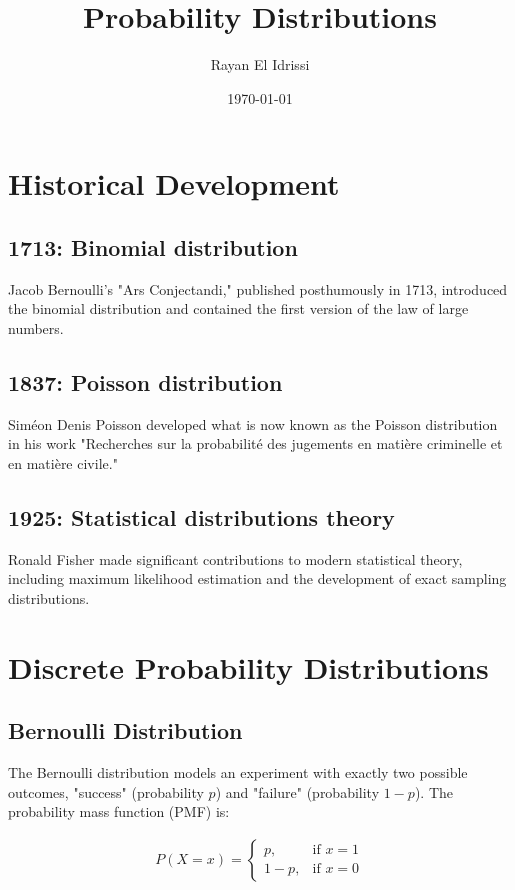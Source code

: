 \documentclass[12pt,a4paper]{article}
\title{Probability Distributions}
\author{Rayan El Idrissi}
\date{\today}
\begin{document}
\maketitle
\tableofcontents
\newpage

\section{Historical Development}
\subsection{1713: Binomial distribution}
Jacob Bernoulli's "Ars Conjectandi," published posthumously in 1713, introduced the binomial distribution and contained the first version of the law of large numbers.

\subsection{1837: Poisson distribution}
Siméon Denis Poisson developed what is now known as the Poisson distribution in his work "Recherches sur la probabilité des jugements en matière criminelle et en matière civile."

\subsection{1925: Statistical distributions theory}
Ronald Fisher made significant contributions to modern statistical theory, including maximum likelihood estimation and the development of exact sampling distributions.

\section{Discrete Probability Distributions}
\subsection{Bernoulli Distribution}
The Bernoulli distribution models an experiment with exactly two possible outcomes, "success" (probability $p$) and "failure" (probability $1-p$). The probability mass function (PMF) is:

\begin{align}
P(X = x) = \begin{cases}
p, & \text{if } x = 1 \\
1-p, & \text{if } x = 0
\end{cases}
\end{align}
\end{document}
